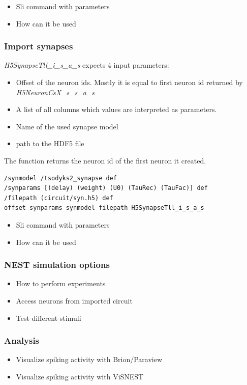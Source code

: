 \documentclass[a4paper]{article}
\begin{document}
\begin{itemize}
      \item Sli command with parameters
      \item How can it be used
\end{itemize}

\subsubsection{Import synapses}
\emph{H5SynapseTll\_i\_s\_a\_s} expects 4 input parameters:
\begin{itemize}
      \item Offset of the neuron ids. Mostly it is equal to first neuron id returned by \emph{H5NeuronCsX\_s\_s\_a\_s}

      \item A list of all columns which values are interpreted as parameters.
      
      \item Name of the used synapse model
      
      \item path to the HDF5 file 
\end{itemize}
The function returns the neuron id of the first neuron it created.

\begin{lstlisting}[label=sliSynapses,caption=Example importing synapses]
/synmodel /tsodyks2_synapse def
/synparams [(delay) (weight) (U0) (TauRec) (TauFac)] def
/filepath (circuit/syn.h5) def
offset synparams synmodel filepath H5SynapseTll_i_s_a_s
\end{lstlisting}
\begin{itemize}
      \item Sli command with parameters
      \item How can it be used
\end{itemize}

\subsubsection{NEST simulation options}
\begin{itemize}
	  \item How to perform experiments
      \item Access neurons from imported circuit
      \item Test different stimuli 
\end{itemize}

\subsubsection{Analysis}
\begin{itemize}
	  \item Visualize spiking activity with Brion/Paraview
      \item Visualize spiking activity with ViSNEST
\end{itemize}
\end{document}
